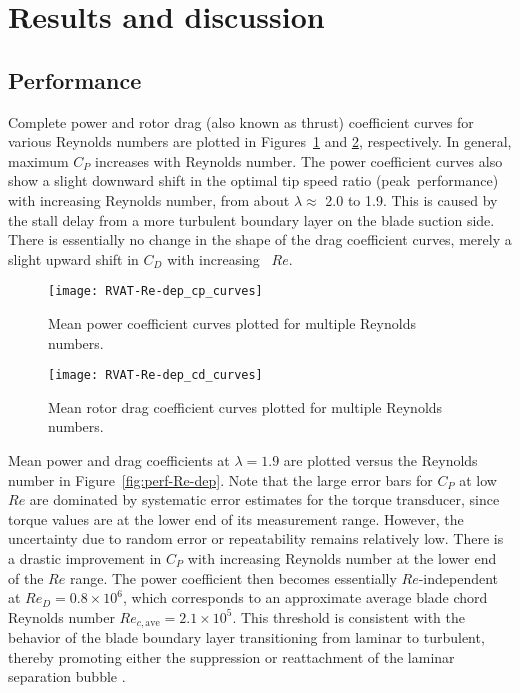 \section{Results and discussion}

\subsection{Performance}

Complete power and rotor drag (also known as thrust) coefficient curves for
various Reynolds numbers are plotted in Figures~\ref{fig:cp-curves} and
\ref{fig:cd-curves}, respectively. In general, maximum $C_P$ increases with
Reynolds number. The power coefficient curves also show a slight downward shift
in the optimal tip speed ratio (peak~performance) with increasing Reynolds
number, from about $\lambda \approx$ 2.0 to 1.9. This is caused by the stall
delay from a more turbulent boundary layer on the blade suction side. There is
essentially no change in the shape of the drag coefficient curves, merely a
slight upward shift in $C_D$ with increasing~ $Re$.

\begin{figure}
    \centering
    
    \texttt{[image: RVAT-Re-dep\_cp\_curves]}
    
    \caption{Mean power coefficient curves plotted for multiple Reynolds numbers.}
    
    \label{fig:cp-curves}
\end{figure}

\begin{figure}
    \centering
    
    \texttt{[image: RVAT-Re-dep\_cd\_curves]}
    
    \caption{Mean rotor drag coefficient curves plotted for multiple Reynolds
        numbers.}
    
    \label{fig:cd-curves}
\end{figure}

Mean power and drag coefficients at $\lambda=1.9$ are plotted versus the
Reynolds number in Figure~\ref{fig:perf-Re-dep}. Note that the large error bars
for $C_P$ at low $Re$ are dominated by systematic error estimates for the torque
transducer, since torque values are at the lower end of its measurement range.
However, the uncertainty due to random error or repeatability remains relatively
low. There is a drastic improvement in $C_P$ with increasing Reynolds number at
the lower end of the $Re$ range. The power coefficient then becomes essentially
$Re$-independent at $Re_D = 0.8 \times 10^6$, which corresponds to an
approximate average blade chord Reynolds number $Re_{c, \mathrm{ave}} = 2.1
\times 10^5$. This threshold is consistent with the behavior of the blade
boundary layer transitioning from laminar to turbulent, thereby promoting either
the suppression or reattachment of the laminar separation bubble
\cite{Lissaman1983}.


